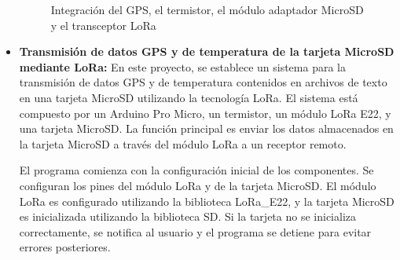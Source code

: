 \begin{itemize}
		\begin{figure}[H]
		\centering
		\quad
		\caption{ Integración del GPS, el termistor, el módulo adaptador MicroSD y el
			transceptor LoRa}
	\end{figure}
	
	\item \textbf{Transmisión de datos GPS y de temperatura de la tarjeta MicroSD mediante LoRa:} 
	En este proyecto, se establece un sistema para la transmisión de datos GPS y de temperatura contenidos en archivos de texto en una tarjeta MicroSD utilizando la tecnología LoRa. El sistema está compuesto por un Arduino Pro Micro, un termistor, un módulo LoRa E22, y una tarjeta MicroSD. La función principal es enviar los datos almacenados en la tarjeta MicroSD a través del módulo LoRa a un receptor remoto.
	
	El programa comienza con la configuración inicial de los componentes. Se configuran los pines del módulo LoRa y de la tarjeta MicroSD. El módulo LoRa es configurado utilizando la biblioteca LoRa\_E22, y la tarjeta MicroSD es inicializada utilizando la biblioteca SD. Si la tarjeta no se inicializa correctamente, se notifica al usuario y el programa se detiene para evitar errores posteriores.
	

\end{itemize}

